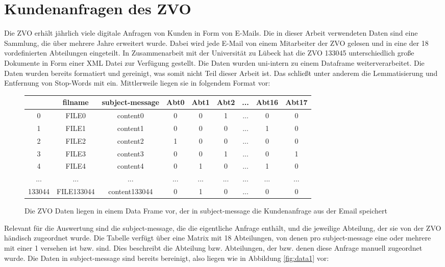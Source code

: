 \documentclass[german,version-2020-11]{uzl-thesis}
\begin{document}
\section{Kundenanfragen des ZVO}
Die ZVO erhält jährlich viele digitale Anfragen von Kunden in Form von E-Mails. Die in dieser Arbeit verwendeten Daten sind eine Sammlung, die über mehrere Jahre erweitert wurde. Dabei wird jede E-Mail von einem Mitarbeiter der ZVO gelesen und in eine der 18 vordefinierten Abteilungen eingeteilt. In Zusammenarbeit mit der Universität zu Lübeck hat die ZVO 133045 unterschiedlich große Dokumente in Form einer XML Datei zur Verfügung gestellt. Die Daten wurden uni-intern zu einem Dataframe weiterverarbeitet. Die Daten wurden bereits formatiert und gereinigt, was somit nicht Teil dieser Arbeit ist. Das schließt unter anderem die Lemmatisierung und Entfernung von Stop-Words mit ein. Mittlerweile liegen sie in folgendem Format vor: 

\begin{figure}[h]
\begin{center}
\begin{tabular}{ccccccccc}
\hline
\hline
& filname & subject-message & Abt0 & Abt1 & Abt2 &  ... & Abt16 & Abt17\\
\hline
0 & FILE0& content0 &0&0&1&...&0&0\\
1& FILE1 & content1 &0 &0 &0 &... &1&0\\
2& FILE2 & content2 & 1 &0 &0 &...&0 &0 \\
3& FILE3 & content3 & 0 & 0 &1 &...&0 &1 \\
4& FILE4 & content4 & 0 & 1 &0 &...&1 &0 \\
...& ... & ... & ... & ...  &... &... &... & ... \\
133044& FILE133044 & content133044 & 0 &1 & 0&...&0&0\\
\hline
\hline
\end{tabular}
\caption{Die ZVO Daten liegen in einem Data Frame vor, der in subject-message die Kundenanfrage aus der Email speichert} 
\end{center}
\end{figure}

Relevant für die Auswertung sind die subject-message, die die eigentliche Anfrage enthält, und die jeweilige Abteilung, der sie von der ZVO händisch zugeordnet wurde. Die Tabelle verfügt über eine Matrix mit 18 Abteilungen, von denen pro subject-message eine oder mehrere mit einer 1 versehen ist bzw. sind. Dies beschreibt die Abteilung bzw. Abteilungen, der bzw. denen diese Anfrage manuell zugeordnet wurde. Die Daten in subject-message sind bereits bereinigt, also liegen wie in Abbildung \ref{fig:data1} vor:\\
\end{document}

